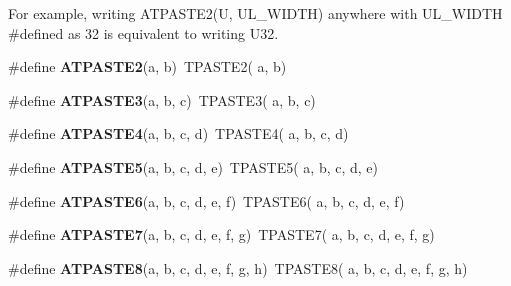 For example, writing A\-T\-P\-A\-S\-T\-E2(\-U, U\-L\-\_\-\-W\-I\-D\-T\-H) anywhere with U\-L\-\_\-\-W\-I\-D\-T\-H \#defined as 32 is equivalent to writing U32. \begin{DoxyCompactItemize}
\item 
\hypertarget{group__group__xmega__utils__tpaste_gafd3b4e313492a0862292dc3072d8e347}{\#define {\bfseries A\-T\-P\-A\-S\-T\-E2}(a, b)~T\-P\-A\-S\-T\-E2( a, b)}\label{group__group__xmega__utils__tpaste_gafd3b4e313492a0862292dc3072d8e347}

\item 
\hypertarget{group__group__xmega__utils__tpaste_ga80b7594516326045fbcaec54d7759c20}{\#define {\bfseries A\-T\-P\-A\-S\-T\-E3}(a, b, c)~T\-P\-A\-S\-T\-E3( a, b, c)}\label{group__group__xmega__utils__tpaste_ga80b7594516326045fbcaec54d7759c20}

\item 
\hypertarget{group__group__xmega__utils__tpaste_gad9dcc51074148a4ff01810033a41e282}{\#define {\bfseries A\-T\-P\-A\-S\-T\-E4}(a, b, c, d)~T\-P\-A\-S\-T\-E4( a, b, c, d)}\label{group__group__xmega__utils__tpaste_gad9dcc51074148a4ff01810033a41e282}

\item 
\hypertarget{group__group__xmega__utils__tpaste_ga4e4994267872724c11e31f1274c1a84c}{\#define {\bfseries A\-T\-P\-A\-S\-T\-E5}(a, b, c, d, e)~T\-P\-A\-S\-T\-E5( a, b, c, d, e)}\label{group__group__xmega__utils__tpaste_ga4e4994267872724c11e31f1274c1a84c}

\item 
\hypertarget{group__group__xmega__utils__tpaste_ga5bbd1842581ea1fa81616d3222bda308}{\#define {\bfseries A\-T\-P\-A\-S\-T\-E6}(a, b, c, d, e, f)~T\-P\-A\-S\-T\-E6( a, b, c, d, e, f)}\label{group__group__xmega__utils__tpaste_ga5bbd1842581ea1fa81616d3222bda308}

\item 
\hypertarget{group__group__xmega__utils__tpaste_gabecc8ad964051f6f877f14dd13919b18}{\#define {\bfseries A\-T\-P\-A\-S\-T\-E7}(a, b, c, d, e, f, g)~T\-P\-A\-S\-T\-E7( a, b, c, d, e, f, g)}\label{group__group__xmega__utils__tpaste_gabecc8ad964051f6f877f14dd13919b18}

\item 
\hypertarget{group__group__xmega__utils__tpaste_ga303651436fcc8283bd17c13578476c8e}{\#define {\bfseries A\-T\-P\-A\-S\-T\-E8}(a, b, c, d, e, f, g, h)~T\-P\-A\-S\-T\-E8( a, b, c, d, e, f, g, h)}\label{group__group__xmega__utils__tpaste_ga303651436fcc8283bd17c13578476c8e}


\end{DoxyCompactItemize}
